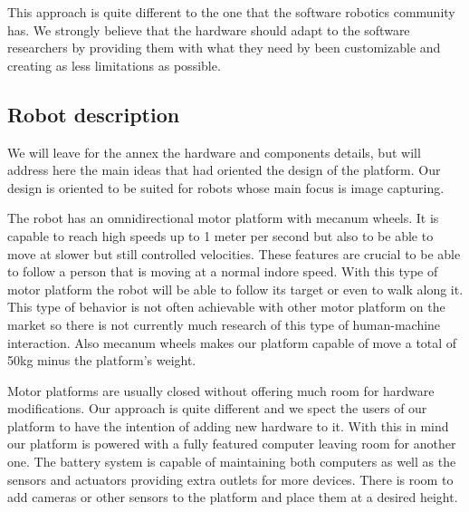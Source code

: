This approach is quite different to the one that the software robotics community has.
We strongly believe that the hardware should adapt to the software researchers by providing them with what they need by been customizable and creating as less limitations as possible.

%
\subsection{Robot description}
We will leave for the annex the hardware and components details, but will address here the main ideas that had oriented the design of the platform.
Our design is oriented to be suited for robots whose main focus is image capturing.

The robot has an omnidirectional motor platform with mecanum wheels.
It is capable to reach high speeds up to 1 meter per second but also to be able to move at slower but still controlled velocities.
These features are crucial to be able to follow a person that is moving at a normal indore speed.
With this type of motor platform the robot will be able to follow its target or even to walk along it.
This type of behavior is not often achievable with other motor platform on the market so there is not currently much research of this type of human-machine interaction.
Also mecanum wheels makes our platform capable of move a total of 50kg minus the platform's weight.

Motor platforms are usually closed without offering much room for hardware modifications.
Our approach is quite different and we spect the users of our platform to have the intention of adding new hardware to it.
With this in mind our platform is powered with a fully featured computer leaving room for another one.
The battery system is capable of maintaining both computers as well as the sensors and actuators providing extra outlets for more devices.
There is room to add cameras or other sensors to the platform and place them at a desired height.

